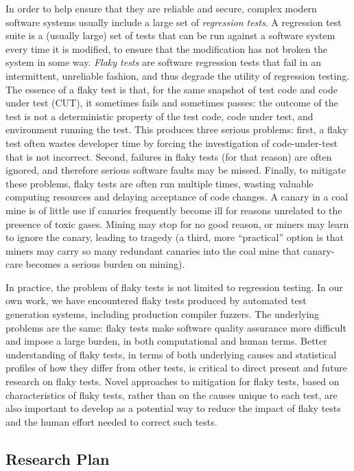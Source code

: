 \documentclass[10pt]{article}
\begin{document}
In order to help ensure that they are reliable and secure, complex modern software systems usually include a large set of \emph{regression tests}.  A regression test suite is a (usually large) set of tests that can be run against a software system every time it is modified, to ensure that the modification has not broken the system in some way.
\emph{Flaky tests} \cite{miccoflaky} are software regression tests that fail in an intermittent, unreliable fashion, and thus degrade the utility of regression testing.  The essence of a flaky test is that, for the same snapshot of test code and code under test (CUT), it sometimes fails and sometimes passes:  the outcome of the test is not a deterministic property of the test code, code under test, and environment running the test.  This produces three serious problems:  first, a flaky test often wastes developer time by forcing the investigation of code-under-test that is not incorrect.  Second, failures in flaky tests (for that reason) are often ignored, and therefore serious software faults may be missed.  Finally, to mitigate these problems, flaky tests are often run multiple times, wasting valuable computing resources and delaying acceptance of code changes.  A canary in a coal mine is of little use if canaries frequently become ill for reasons unrelated to the presence of toxic gases.  Mining may stop for no good reason, or miners may learn to ignore the canary, leading to tragedy (a third, more ``practical'' option is that miners may carry so many redundant canaries into the coal mine that canary-care becomes a serious burden on mining).

In practice, the problem of flaky tests is not limited to regression testing.  In our own work, we have encountered flaky tests produced by automated test generation systems, including production compiler fuzzers.  The underlying problems are the same:  flaky tests make software quality assurance more difficult and impose a large burden, in both computational and human terms.  Better understanding of flaky tests, in terms of both underlying causes and statistical profiles of how they differ from other tests, is critical to direct present and future research on flaky tests.  Novel approaches to mitigation for flaky tests, based on characteristics of flaky tests, rather than on the causes unique to each test, are also important to develop as a potential way to reduce the impact of flaky tests and the human effort needed to correct such tests.

\subsection{Research Plan}
\end{document}
